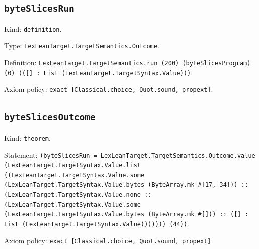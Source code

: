 \documentclass[11pt]{article}
\begin{document}
\subsection*{\texttt{byteSlicesRun}}
\noindent Kind: \texttt{definition}.\par
\noindent Type: \texttt{LexLeanTarget.TargetSemantics.Outcome}.\par
\noindent Definition: \texttt{LexLeanTarget.TargetSemantics.run (200) (byteSlicesProgram) (0) (([] : List (LexLeanTarget.TargetSyntax.Value)))}.\par
\noindent Axiom policy: \texttt{exact [Classical.choice, Quot.sound, propext]}.\par
\subsection*{\texttt{byteSlicesOutcome}}
\noindent Kind: \texttt{theorem}.\par
\noindent Statement: \texttt{(byteSlicesRun = LexLeanTarget.TargetSemantics.Outcome.value (LexLeanTarget.TargetSyntax.Value.list ((LexLeanTarget.TargetSyntax.Value.some (LexLeanTarget.TargetSyntax.Value.bytes (ByteArray.mk \#[17, 34])) :: (LexLeanTarget.TargetSyntax.Value.none :: (LexLeanTarget.TargetSyntax.Value.some (LexLeanTarget.TargetSyntax.Value.bytes (ByteArray.mk \#[])) :: ([] : List (LexLeanTarget.TargetSyntax.Value))))))) (44))}.\par
\noindent Axiom policy: \texttt{exact [Classical.choice, Quot.sound, propext]}.\par
\end{document}
